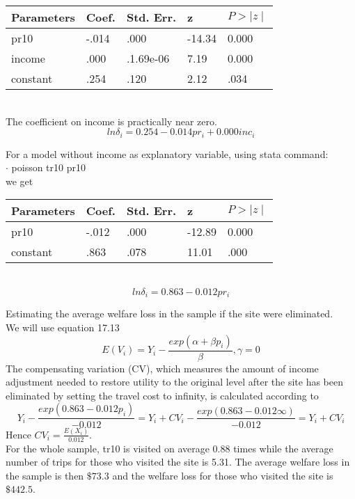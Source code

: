 \documentclass[12pt]{article}
\begin{document}
\begin {enumerate}
\begin{enumerate}
\begin{tabular}{ |p{2cm}|p{2cm} p{2cm} p{2cm} p{2cm}|  }

 \hline
 Parameters & Coef. & Std. Err. & z & $P> \mid z \mid
 $ \\
 \hline
 pr10   & -.014    & .000  & -14.34 & 0.000\\
 income &   .000  & .1.69e-06   & 7.19 & 0.000\\
 constant & .254 & .120 & 2.12 & .034\\

 \hline
\end{tabular}\\

The coefficient on income is practically near zero.
\[ ln \delta_i = 0.254 -0.014 pr_i + 0.000 inc_i \]

For a model without income as explanatory variable, using stata command: \\
$\cdotp$ poisson tr10 pr10 \\
we get\\

\begin{tabular}{ |p{2cm}|p{2cm} p{2cm} p{2cm} p{2cm}|  }

 \hline
 Parameters & Coef. & Std. Err. & z & $P> \mid z \mid
 $ \\
 \hline
 pr10   & -.012    & .000  & -12.89 & 0.000\\
 constant & .863 & .078 & 11.01 & .000\\
 \hline
\end{tabular}\\
\[ ln \delta_i = 0.863 - 0.012 pr_i  \]

Estimating the average welfare loss in the sample if the site were eliminated.\\
We will use equation 17.13 
\[E(V_i) = Y_i - \frac{exp(\alpha + \beta p_i)}{\beta}, \gamma = 0 \]
The compensating variation (CV), which measures the amount of income adjustment needed to restore utility to the original level after the site has been eliminated by setting the travel cost to infinity, is calculated according to 
\[Y_i - \frac{exp(0.863 - 0.012 p_i)}{-0.012} = Y_i + CV_i - \frac{exp(0.863 - 0.012 \infty)}{-0.012} = Y_i + CV_i\]
Hence $CV_i = \frac{E(X_i)}{0.012}$. \\
For the  whole sample, tr10 is visited on average 0.88 times while the average number of trips for those who visited the site is 5.31. The average welfare loss in the sample is then $\$73.3$ and the welfare loss for those who visited the site is $\$442.5$. \\


\end{enumerate}
\end{enumerate}
\end{document}
